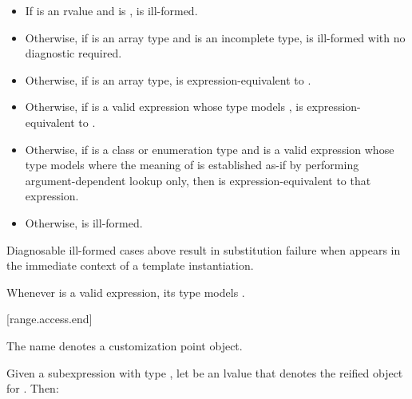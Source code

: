 \begin{itemize}
\item
  If  is an rvalue and
   is ,
   is ill-formed.

\item
  Otherwise, if  is an array type and
   is an incomplete type,
   is ill-formed with no diagnostic required.

\item
  Otherwise, if  is an array type,
   is expression-equivalent to .

\item
  Otherwise, if 
  is a valid expression whose type models
  ,
   is expression-equivalent to
  .

\item
  Otherwise, if  is a class or enumeration type and
  is a valid expression whose type models
  where the meaning of  is established as-if by performing
  argument-dependent lookup only,
  then  is expression-equivalent to
  that expression.

\item
  Otherwise,  is ill-formed.
\end{itemize}

\pnum
\begin{note}
Diagnosable ill-formed cases above
result in substitution failure when 
appears in the immediate context of a template instantiation.
\end{note}

\pnum
\begin{note}
Whenever  is a valid expression, its type models
.
\end{note}

[range.access.end]{}
%

\pnum
The name  denotes a customization point
object.

\pnum
Given a subexpression  with type ,
let  be an lvalue that denotes the reified object for .
Then:

